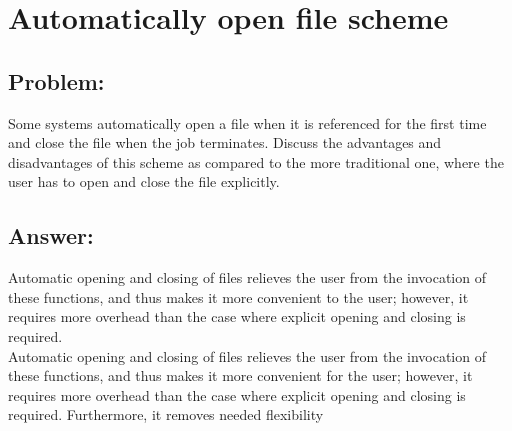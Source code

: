 \newpage
\section{Automatically open file scheme}
\subsection{Problem:}
Some systems automatically open a file when it is referenced for the first time and close the file
when the job terminates. Discuss the advantages and disadvantages of this scheme as compared
to the more traditional one, where the user has to open and close the file explicitly.

\subsection{Answer:}
Automatic opening and closing of files relieves the user from the invocation of these functions, and thus makes it more convenient to the user; however, it requires more overhead than the case where explicit opening and closing is required. \\

Automatic opening and closing of files relieves the user from the invocation of these functions, and thus makes it more convenient for the user; however, it requires more overhead than the case where explicit opening and closing is required. Furthermore, it removes needed flexibility
